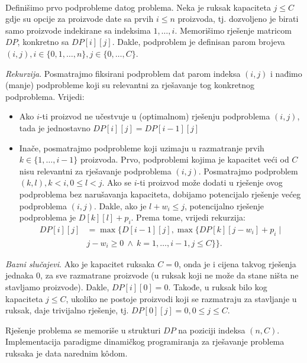\begin{solution}
	\\
	Definišimo prvo podprobleme datog problema. Neka je ruksak kapaciteta $j\leq C$ gdje su opcije za proizvode date sa prvih $i\leq n$ proizvoda, tj. dozvoljeno je birati samo proizvode indekirane sa indeksima $1, \ldots , i$.  Memorišimo rješenje matricom $DP$, konkretno sa $DP[i ][j]$. Dakle, podpro\-blem je definisan parom brojeva $(i,j), i\in \{0, 1, \ldots, n\}, j \in \{0, \ldots, C \}$. 
	
	\textit{Rekurzija}. Posmatrajmo fiksirani podproblem dat parom indeksa $(i, j)$ i nađimo  (manje) podprobleme koji su relevantni za rješavanje tog konkretnog podproblema. Vrijedi:
	
	\begin{itemize}
		\item Ako $i$-ti proizvod ne učestvuje u (optimalnom) rješenju podproblema $(i, j)$, tada je jednostavno $DP[i][j] = DP[i-1][j]  $
		\item     Inače, posmatrajmo podprobleme koji uzimaju u razmatranje prvih $k\in \{1, \ldots, i-1\}$ proizvoda. Prvo, podproblemi kojima je kapacitet veći od $C$ nisu relevantni za rješavanje podproblema $(i,j)$. Posmatra\-jmo podproblem $(k,l), k < i, 0 \leq l < j$. Ako se  $i$-ti proizvod može dodati u rješenje ovog podproblema bez narušavanja kapaciteta, dobija\-mo potencijalo rješenje većeg podproblema $(i,j)$. Dakle, ako je $l + w_i \leq j$, potencijalno rješenje podproblema je $D[k][l] + p_i$.  Prema tome, vrijedi rekurzija:
	   \begin{align*}
		      DP[i ][j ]& = \max\{ D[i-1][j], \max\{DP[k][j - w_i ] + p_i \mid   \\   & j - w_i \geq  0 \ \wedge\  k=1, \ldots, i-1, j \leq C\}\}.
		\end{align*}
	\end{itemize}
	
	 \textit{ Bazni slučajevi}. Ako je kapacitet ruksaka $C=0$, onda je i cijena takvog rješenja jednaka 0, za sve razmatrane proizvode (u ruksak koji ne može da stane ništa ne  stavljamo proizvode). Dakle, $DP[i][0] = 0.$ Takođe, u ruksak bilo kog kapaciteta $j \leq C$, ukoliko ne postoje proizvodi koji se razmatraju za stavljanje u ruksak, daje trivijalno rješenje, tj. $DP[0][j] = 0, 0 \leq j \leq C$.
	 
	 Rješenje problema se memoriše u strukturi $DP$ na poziciji indeksa $(n, C)$.  \\
	 
	 Implementacija paradigme dinamičkog programiranja za rješavanje pro\-blema ruksaka je data narednim k\^odom.
	 

\end{solution}
